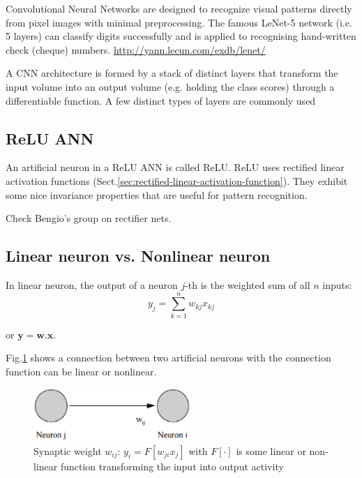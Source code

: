Convolutional Neural Networks are designed to recognize visual patterns directly
from pixel images with minimal preprocessing.
The famous LeNet-5 network (i.e. 5 layers) can classify digits successfully and
is applied to recognising hand-written check (cheque) numbers.
\url{http://yann.lecun.com/exdb/lenet/}

A CNN architecture is formed by a stack of distinct layers that transform the
input volume into an output volume (e.g. holding the class scores) through a
differentiable function. A few distinct types of layers are commonly used

\subsection{ReLU ANN}

An artificial neuron in a ReLU ANN is called ReLU.
ReLU uses rectified linear activation functions
(Sect.\ref{sec:rectified-linear-activation-function}).
They exhibit some nice invariance properties that are useful for pattern
recognition.

Check Bengio's group on rectifier nets.

\subsection{Linear neuron vs. Nonlinear neuron}
\label{sec:linear-neuron}
\label{sec:nonlinear-neuron}

In linear neuron, the output of a neuron $j$-th is the weighted sum of all
$n$ inputs:
\begin{equation}
y_j = \sum_{k=1}^n w_{kj}x_{kj}
\end{equation}

or $\mathbf{y}=\mathbf{w.x}$.

Fig.\ref{fig:artificial-neuron} shows a connection between two artificial
neurons with the connection function can be linear or nonlinear.

\begin{figure}[htb]
  \centerline{\includegraphics[height=2cm]{./images/Hebbian_simple_formula.eps}}
  \caption{Synaptic weight $w_{ij}$:
  $y_i=F[w_{ji}x_j]$ with $F[\cdot]$ is some
  linear or non-linear function transforming the input into output activity}\label{fig:artificial-neuron}
\end{figure}


